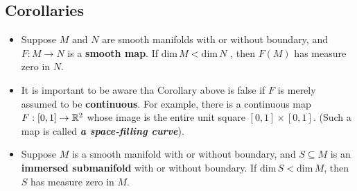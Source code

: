 \documentclass[11pt]{article}
\begin{document}
\subsection{Corollaries}
\begin{itemize}
\item \begin{corollary}
Suppose $M$ and $N$ are smooth manifolds with or without boundary, and $F: M \rightarrow N$ is a \textbf{smooth map}. If $\text{dim}\,M < \text{dim}\,N$ , then $F(M)$ has measure
zero in $N$.
\end{corollary}

\item \begin{remark}
It is important to be aware tha Corollary above is false if $F$ is merely assumed to be \textbf{continuous}. For example, there is a continuous map $F: [0,1] \rightarrow {\mathbb R}^2$ whose image is the entire unit square $[0,1] \times [0, 1]$. (Such a map is called \emph{\textbf{a space-filling curve}}).
\end{remark}

\item \begin{corollary}
Suppose $M$ is a smooth manifold with or without boundary, and $S \subseteq M$ is an \textbf{immersed submanifold} with or without boundary. If $\text{dim}\,S < \text{dim}\,M$,  then $S$ has measure zero in $M$.
\end{corollary}
\end{itemize}
\end{document}
